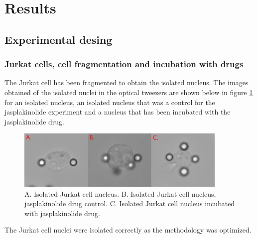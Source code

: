 \documentclass[12pt, a4paper]{article} %
\begin{document}
	
	\section{Results}
	
	\subsection{Experimental desing}
	
	\subsubsection{Jurkat cells, cell fragmentation and incubation with drugs}
	
	The Jurkat cell has been fragmented to obtain the isolated nucleus. The images obtained of the isolated nuclei in the optical tweezers are shown below in figure \ref{fig:jurkat_cells} for an isolated nucleus, an isolated nucleus that was a control for the jasplakinolide experiment and a nucleus that has been incubated with the jasplakinolide drug.
	
	\setlength{\parskip}{4mm}
	
	\begin{figure}[htbp]
		\centering
		\includegraphics[width=0.9\textwidth]{figures/jurkat_cell_shape.png}
		\caption{A. Isolated Jurkat cell nucleus. B. Isolated Jurkat cell nucleus, jasplakinolide drug control. C. Isolated Jurkat cell nucleus incubated with jasplakinolide drug.}
		\label{fig:jurkat_cells}
	\end{figure}
	
	The Jurkat cell nuclei were isolated correctly as the methodology was optimized.
	
\end{document}
